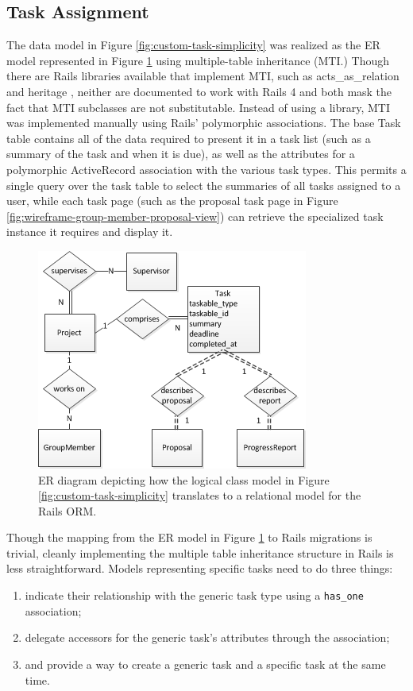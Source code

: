 \documentclass[document.tex]{subfiles}
\begin{document}
\FloatBarrier


\subsection{Task Assignment}
\label {sec:4ys-task-assignment}

The data model in Figure \ref{fig:custom-task-simplicity} was realized as the ER model represented in Figure \ref{fig:custom-task-er-model} using multiple-table inheritance (MTI.) Though there are Rails libraries available that implement MTI, such as acts\_as\_relation \cite{acts_as_relation} and heritage \cite{heritage}, neither are documented to work with Rails 4 and both mask the fact that MTI subclasses are not substitutable. Instead of using a library, MTI was implemented manually using Rails’ polymorphic associations. The base Task table contains all of the data required to present it in a task list (such as a summary of the task and when it is due), as well as the attributes for a polymorphic ActiveRecord association with the various task types. This permits a single query over the task table to select the summaries of all tasks assigned to a user, while each task page (such as the proposal task page in Figure \ref{fig:wireframe-group-member-proposal-view}) can retrieve the specialized task instance it requires and display it.

\begin{figure}[!htbp]
\centering \includegraphics{./img/case-study-fourth-year-system/task-through-project-er-model}
\caption{ER diagram depicting how the logical class model in Figure \ref{fig:custom-task-simplicity} translates to a relational model for the Rails ORM.}
\label{fig:custom-task-er-model}
\end{figure}

Though the mapping from the ER model in Figure \ref{fig:custom-task-er-model} to Rails migrations is trivial, cleanly implementing the multiple table inheritance structure in Rails is less straightforward. Models representing specific tasks need to do three things:
\begin{enumerate}
  \item indicate their relationship with the generic task type using a \verb!has_one! association;
  \item delegate accessors for the generic task’s attributes through the association;
  \item and provide a way to create a generic task and a specific task at the same time.
\end{enumerate}
\end{document}
